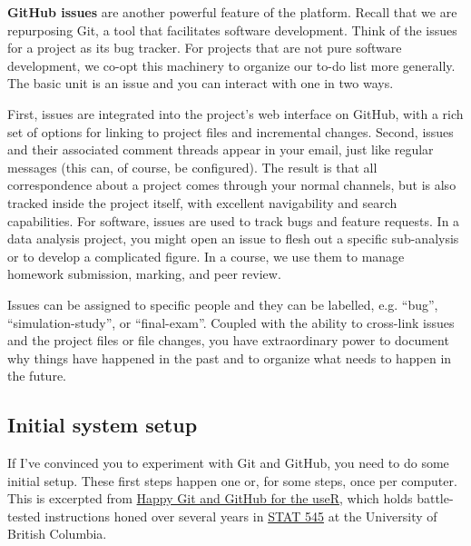 \documentclass[12pt]{article}
\begin{document}
\textbf{GitHub issues} are another powerful feature of the platform.
Recall that we are repurposing Git, a tool that facilitates software
development. Think of the issues for a project as its bug tracker. For
projects that are not pure software development, we co-opt this
machinery to organize our to-do list more generally. The basic unit is
an issue and you can interact with one in two ways.

First, issues are integrated into the project's web interface on GitHub,
with a rich set of options for linking to project files and incremental
changes. Second, issues and their associated comment threads appear in
your email, just like regular messages (this can, of course, be
configured). The result is that all correspondence about a project comes
through your normal channels, but is also tracked inside the project
itself, with excellent navigability and search capabilities. For
software, issues are used to track bugs and feature requests. In a data
analysis project, you might open an issue to flesh out a specific
sub-analysis or to develop a complicated figure. In a course, we use
them to manage homework submission, marking, and peer review.

Issues can be assigned to specific people and they can be labelled, e.g.
``bug'', ``simulation-study'', or ``final-exam''. Coupled with the
ability to cross-link issues and the project files or file changes, you
have extraordinary power to document why things have happened in the
past and to organize what needs to happen in the future.

\subsection{Initial system setup}\label{initial-system-setup}

If I've convinced you to experiment with Git and GitHub, you need to do
some initial setup. These first steps happen one or, for some steps,
once per computer. This is excerpted from
\href{http://happygitwithr.com}{Happy Git and GitHub for the useR},
which holds battle-tested instructions honed over several years in
\href{http://stat545.com}{STAT 545} at the University of British
Columbia.
\end{document}

